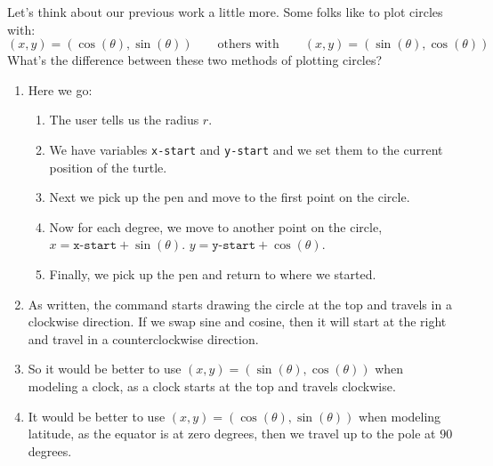 \documentclass[noauthor,nooutcomes,handout]{ximera}
\begin{document}
\begin{question}
  Let's think about our previous work a little more.
  Some folks like to plot circles with:
    \[
    (x,y) = (\cos(\theta),\sin(\theta)) \qquad\text{others with}\qquad  (x,y) = (\sin(\theta),\cos(\theta))
    \]
    What's the difference between these two methods of plotting circles?
      
  \begin{freeResponse}
    \begin{enumerate}
    \item Here we go:
      \begin{enumerate}
      \item The user tells us the radius $r$.
      \item We have variables \texttt{x-start} and \texttt{y-start}
        and we set them to the current position of the turtle.
      \item Next we pick up the pen and move to the first point on the circle.
      \item Now for each degree, we move to another point on the circle, $x= \texttt{x-start} + \sin(\theta)$. $y= \texttt{y-start} + \cos(\theta)$. 
      \item Finally, we pick up the pen and return to where we started.
      \end{enumerate}
    \item As written, the command starts drawing the circle at the top
      and travels in a clockwise direction. If we swap sine and
      cosine, then it will start at the right and travel in a
      counterclockwise direction.
    \item So it would be better to use $(x,y) =
      (\sin(\theta),\cos(\theta))$ when modeling a clock, as a clock starts at the top and travels clockwise.
    \item It would be better to use $(x,y) =
      (\cos(\theta),\sin(\theta))$ when modeling latitude, as the
      equator is at zero degrees, then we travel up to the pole at
      $90$ degrees.
    \end{enumerate}
  \end{freeResponse}
\end{question}
\mynewpage
\end{document}
